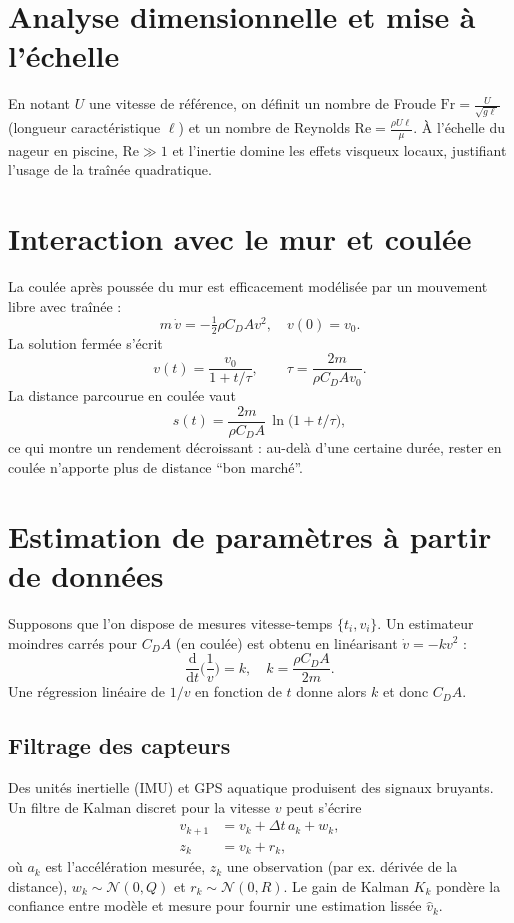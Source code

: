 \documentclass[11pt,a4paper]{article}
\newcommand{\dd}{\mathrm{d}}
\begin{document}
\section{Analyse dimensionnelle et mise à l'échelle}
En notant $U$ une vitesse de référence, on définit un nombre de Froude $\mathrm{Fr}=\frac{U}{\sqrt{g\ell}}$ (longueur caractéristique $\ell$) et un nombre de Reynolds $\mathrm{Re}=\frac{\rho U \ell}{\mu}$. À l'échelle du nageur en piscine, $\mathrm{Re}\gg 1$ et l'inertie domine les effets visqueux locaux, justifiant l'usage de la traînée quadratique.

\section{Interaction avec le mur et coulée}
La coulée après poussée du mur est efficacement modélisée par un mouvement libre avec traînée :
\begin{equation}
 m\,\dot v = - \tfrac{1}{2}\rho C_D A v^2, \quad v(0)=v_0.
 \end{equation}
La solution fermée s'écrit
\begin{equation}
 v(t) = \frac{v_0}{1+ t/\tau}, \qquad \tau = \frac{2m}{\rho C_D A v_0}.
 \end{equation}
La distance parcourue en coulée vaut
\begin{equation}
 s(t) = \frac{2m}{\rho C_D A}\,\ln\big(1+t/\tau\big),
 \end{equation}
ce qui montre un rendement décroissant : au-delà d'une certaine durée, rester en coulée n'apporte plus de distance ``bon marché''.

\section{Estimation de paramètres à partir de données}
Supposons que l'on dispose de mesures vitesse-temps $\{t_i,v_i\}$. Un estimateur moindres carrés pour $C_D A$ (en coulée) est obtenu en linéarisant $\dot v = -k v^2$ :
\begin{equation}
 \frac{\dd}{\dd t}\Big(\frac{1}{v}\Big) = k, \quad k=\frac{\rho C_D A}{2m}.
 \end{equation}
Une régression linéaire de $1/v$ en fonction de $t$ donne alors $k$ et donc $C_D A$.

\subsection{Filtrage des capteurs}
Des unités inertielle (IMU) et GPS aquatique produisent des signaux bruyants. Un filtre de Kalman discret pour la vitesse $v$ peut s'écrire
\begin{align}
 v_{k+1} &= v_k + \Delta t\,a_k + w_k, \\
 z_k &= v_k + r_k,
 \end{align}
où $a_k$ est l'accélération mesurée, $z_k$ une observation (par ex. dérivée de la distance), $w_k\sim\mathcal{N}(0,Q)$ et $r_k\sim\mathcal{N}(0,R)$. Le gain de Kalman $K_k$ pondère la confiance entre modèle et mesure pour fournir une estimation lissée $\hat v_k$.
\end{document}
